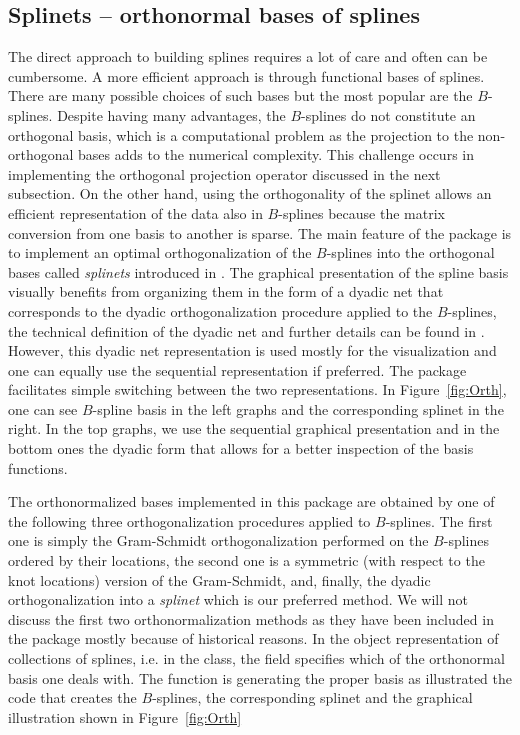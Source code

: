 \subsection{Splinets -- orthonormal bases of splines}
\vspace{-.22cm}
The direct approach to building splines requires a lot of care and often can be cumbersome. 
A more efficient approach is through functional bases of splines. 
There are many possible choices of such bases but the most popular are the $B$-splines. 
Despite having many advantages, the $B$-splines do not constitute an orthogonal basis, which is a computational problem as the projection to the non-orthogonal bases adds to the numerical complexity. 
This challenge occurs in implementing the orthogonal projection operator discussed in the next subsection. 
On the other hand, using the orthogonality of the splinet allows an efficient representation of the data also in $B$-splines because the matrix conversion from one basis to another is sparse.
The main feature of the package is to implement an optimal orthogonalization of the $B$-splines into the orthogonal bases called \emph{splinets} introduced in \cite{LIU2022}. 
The graphical presentation of the spline basis visually benefits from organizing them in the form of a dyadic net that corresponds to the dyadic orthogonalization procedure applied to the $B$-splines, the technical definition of the dyadic net and further details can be found in \cite{LIU2022}. 
However, this dyadic net representation is used mostly for the visualization and one can equally use the sequential representation if preferred.
The package facilitates simple switching between the two representations. 
In Figure~\ref{fig:Orth}, one can see $B$-spline basis in the left graphs and the corresponding  splinet in the right. 
In the top graphs, we use the sequential graphical presentation and in the bottom ones the dyadic form that allows for a better inspection of the basis functions. 


The orthonormalized bases implemented in this package are obtained by one of the following three orthogonalization procedures applied to $B$-splines. 
The first one is simply the Gram-Schmidt orthogonalization performed on the $B$-splines ordered by their locations, the second one is a symmetric (with respect to the knot locations) version of the Gram-Schmidt, and, finally, the dyadic orthogonalization into a {\em splinet} which is our preferred method. 
We will not discuss the first two orthonormalization methods as they have been included in the package mostly because of historical reasons. 
In the object representation of collections of splines, i.e. in the  class, the field  specifies which of the orthonormal basis one deals with. 
The function   is generating the proper basis as illustrated the code that creates the $B$-splines, the corresponding splinet and the graphical illustration shown in Figure~\ref{fig:Orth}

